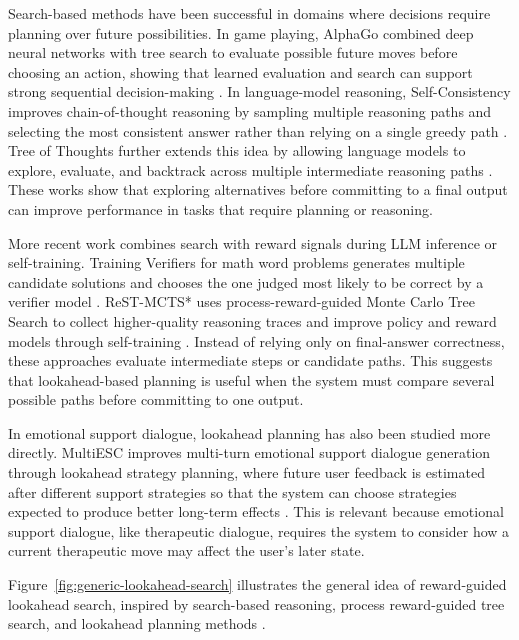 Search-based methods have been successful in domains where decisions require planning over future possibilities. In game playing, AlphaGo combined deep neural networks with tree search to evaluate possible future moves before choosing an action, showing that learned evaluation and search can support strong sequential decision-making \cite{silver2016mastering}. In language-model reasoning, Self-Consistency improves chain-of-thought reasoning by sampling multiple reasoning paths and selecting the most consistent answer rather than relying on a single greedy path \cite{wang2022selfconsistency}. Tree of Thoughts further extends this idea by allowing language models to explore, evaluate, and backtrack across multiple intermediate reasoning paths \cite{yao2023tree}. These works show that exploring alternatives before committing to a final output can improve performance in tasks that require planning or reasoning.

More recent work combines search with reward signals during LLM inference or self-training. Training Verifiers for math word problems generates multiple candidate solutions and chooses the one judged most likely to be correct by a verifier model \cite{cobbe2021training}. ReST-MCTS* uses process-reward-guided Monte Carlo Tree Search to collect higher-quality reasoning traces and improve policy and reward models through self-training \cite{zhang2024restmcts}. Instead of relying only on final-answer correctness, these approaches evaluate intermediate steps or candidate paths. This suggests that lookahead-based planning is useful when the system must compare several possible paths before committing to one output.

In emotional support dialogue, lookahead planning has also been studied more directly. MultiESC improves multi-turn emotional support dialogue generation through lookahead strategy planning, where future user feedback is estimated after different support strategies so that the system can choose strategies expected to produce better long-term effects \cite{cheng2022multiesc}. This is relevant because emotional support dialogue, like therapeutic dialogue, requires the system to consider how a current therapeutic move may affect the user's later state.

Figure~\ref{fig:generic-lookahead-search} illustrates the general idea of reward-guided lookahead search, inspired by search-based reasoning, process reward-guided tree search, and lookahead planning methods \cite{yao2023tree,zhang2024restmcts,cheng2022multiesc}.

